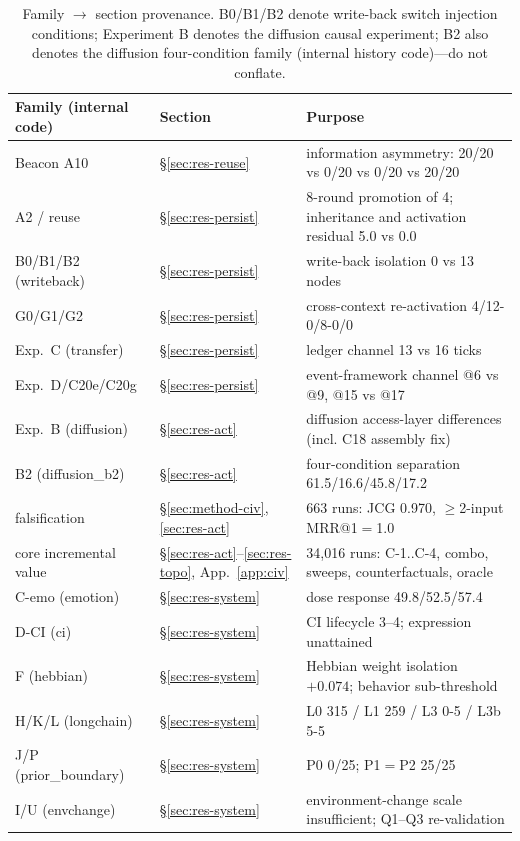 \documentclass[10pt,a4paper]{article}
\begin{document}
\begin{table}[ht]
\centering\small
\caption{Family $\rightarrow$ section provenance. B0/B1/B2 denote write-back switch injection conditions; Experiment B denotes the diffusion causal experiment; B2 also denotes the diffusion four-condition family (internal history code)---do not conflate.}
\label{tab:family}
\begin{tabular}{L{4.6cm}L{3.4cm}L{6.0cm}}
\toprule
\textbf{Family (internal code)} & \textbf{Section} & \textbf{Purpose} \\
\midrule
Beacon A10 & \S\ref{sec:res-reuse} & information asymmetry: 20/20 vs 0/20 vs 0/20 vs 20/20 \\
A2 / reuse & \S\ref{sec:res-persist} & 8-round promotion of 4; inheritance and activation residual 5.0 vs 0.0 \\
B0/B1/B2 (writeback) & \S\ref{sec:res-persist} & write-back isolation 0 vs 13 nodes \\
G0/G1/G2 & \S\ref{sec:res-persist} & cross-context re-activation 4/12-0/8-0/0 \\
Exp.\ C (transfer) & \S\ref{sec:res-persist} & ledger channel 13 vs 16 ticks \\
Exp.\ D/C20e/C20g & \S\ref{sec:res-persist} & event-framework channel @6 vs @9, @15 vs @17 \\
Exp.\ B (diffusion) & \S\ref{sec:res-act} & diffusion access-layer differences (incl. C18 assembly fix) \\
B2 (diffusion\_b2) & \S\ref{sec:res-act} & four-condition separation 61.5/16.6/45.8/17.2 \\
falsification & \S\ref{sec:method-civ}, \ref{sec:res-act} & 663 runs: JCG 0.970, $\ge$2-input MRR@1$=$1.0 \\
core incremental value & \S\ref{sec:res-act}--\ref{sec:res-topo}, App.~\ref{app:civ} & 34{,}016 runs: C-1..C-4, combo, sweeps, counterfactuals, oracle \\
C-emo (emotion) & \S\ref{sec:res-system} & dose response 49.8/52.5/57.4 \\
D-CI (ci) & \S\ref{sec:res-system} & CI lifecycle 3--4; expression unattained \\
F (hebbian) & \S\ref{sec:res-system} & Hebbian weight isolation $+0.074$; behavior sub-threshold \\
H/K/L (longchain) & \S\ref{sec:res-system} & L0 315 / L1 259 / L3 0-5 / L3b 5-5 \\
J/P (prior\_boundary) & \S\ref{sec:res-system} & P0 0/25; P1$=$P2 25/25 \\
I/U (envchange) & \S\ref{sec:res-system} & environment-change scale insufficient; Q1--Q3 re-validation \\

\end{tabular}
\end{table}
\end{document}
